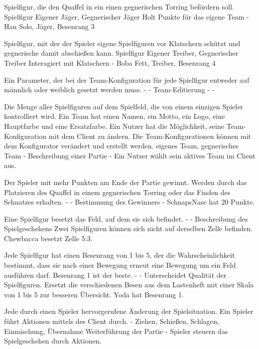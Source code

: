 {Spielfigur, die den Quaffel in ein einen gegnerischen Torring befördern soll.}
{Spielfigur}
{Eigener Jäger, Gegnerischer Jäger}
{Holt Punkte für das eigene Team}
{-}
{Han Solo, Jäger, Besenrang 3}

{Spielfigur, mit der der Spieler eigene Spielfiguren vor Klatschern schützt und gegnerische damit abschießen kann.}
{Spielfigur}
{Eigener Treiber, Gegnerischer Treiber}
{Interagiert mit Klatschern}
{-}
{Boba Fett, Treiber, Besenrang 4}

{Ein Parameter, der bei der Team-Konfiguration für jede Spielfigur entweder auf \glqq{}männlich\grqq{} oder \glqq{}weiblich\grqq{} gesetzt werden muss.}
{-}
{-}
{Team-Editierung}
{-}
{-}

{Die Menge aller Spielfiguren auf dem Spielfeld, die von einem einzigen Spieler kontrolliert wird. Ein Team hat einen Namen, ein Motto, ein Logo, eine Hauptfarbe und eine Ersatzfarbe. Ein Nutzer hat die Möglichkeit, seine Team-Konfiguration mit dem Client zu ändern. Die Team-Konfigurationen können mit dem Konfigurator verändert und erstellt werden.}
{eigenes Team, gegnerisches Team}
{-}
{Beschreibung einer Partie}
{-}
{Ein Nutzer wählt sein aktives Team im Client aus.}

{Der Spieler mit mehr Punkten am Ende der Partie gewinnt. Werden durch das Platzieren des Quaffel in einem gegnerischen Torring oder das Finden des Schnatzes erhalten.}
{-}
{-}
{Bestimmung des Gewinners}
{-}
{SchnapsNase hat 20 Punkte.}

{Eine Spielfigur besetzt das Feld, auf dem sie sich befindet.}
{-}
{-}
{Beschreibung des Spielgeschehens}
{Zwei Spielfiguren können sich nicht auf derselben Zelle befinden.}
{Chewbacca besetzt Zelle 5:3.}

{Jede Spielfigur hat einen Besenrang von 1 bis 5, der die Wahrscheinlichkeit bestimmt, dass sie nach einer Bewegung erneut eine Bewegung um ein Feld ausführen darf. Besenrang 1 ist der beste.}
{-}
{-}
{Unterscheidet Qualität der Spielfiguren.}
{Ersetzt die verschiedenen \glqq{}Besen\grqq{} aus dem Lastenheft mit einer Skala von 1 bis 5 zur besseren Übersicht.}
{Yoda hat Besenrang 1.}

{Jede durch einen Spieler hervorgerufene Änderung der Spielsituation. Ein Spieler führt Aktionen mittels des Client durch.}
{-}
{Ziehen, Schießen, Schlagen, Einmischung, Übernahme}
{Weiterführung der Partie}
{-}
{Spieler steuern das Spielgeschehen durch Aktionen.}

